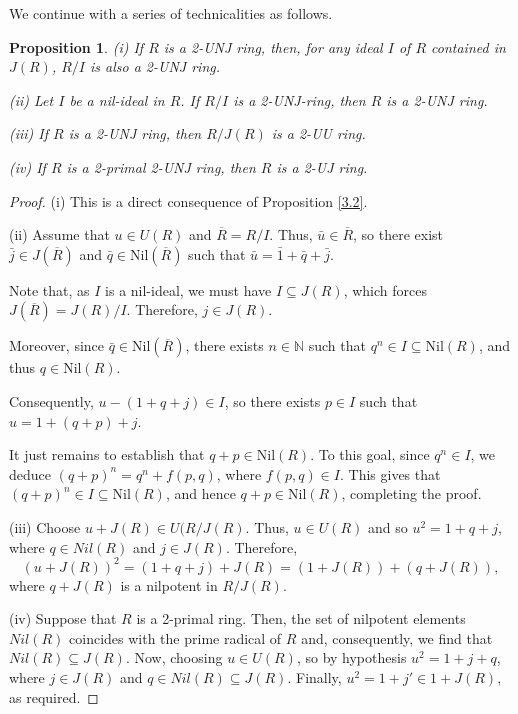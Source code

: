 \documentclass[12pt]{amsart}
\newtheorem{proposition}[theorem]{Proposition}
\theoremstyle{definition}
\begin{document}
We continue with a series of technicalities as follows.

\begin{proposition}\label{3.5}
(i) If \( R \) is a 2-UNJ ring, then, for any ideal \( I \) of \( R \) contained in \( J(R) \), \( R/I \) is also a 2-UNJ ring.

(ii) Let \( I \) be a nil-ideal in \( R \). If \( R/I \) is a 2-UNJ-ring, then \( R \) is a 2-UNJ ring.

(iii) If \( R \) is a 2-UNJ ring, then \( R/J(R) \) is a 2-UU ring.

(iv) If \( R \) is a 2-primal 2-UNJ ring, then \( R \) is a 2-UJ ring.
\end{proposition}

\begin{proof}
(i) This is a direct consequence of Proposition \ref{3.2}.

(ii) Assume that $u \in U(R)$ and $\overline{R}=R/I$. Thus, $\bar{u} \in \overline{R}$, so there exist $\bar{j} \in J(\overline{R})$ and $\bar{q} \in \text{Nil}(\overline{R})$ such that $\bar{u} = \bar{1} + \bar{q} + \bar{j}$.

Note that, as $I$ is a nil-ideal, we must have $I \subseteq J(R)$, which forces $J(\overline{R}) = J(R)/I$. Therefore, $j \in J(R)$.

Moreover, since $\bar{q} \in \text{Nil}(\overline{R})$, there exists $n \in \mathbb{N}$ such that $q^n \in I \subseteq \text{Nil}(R)$, and thus $q \in \text{Nil}(R)$.

Consequently, $u - (1 + q + j) \in I$, so there exists $p \in I$ such that $u = 1 + (q + p) + j$.

It just remains to establish that $q + p \in \text{Nil}(R)$. To this goal, since $q^n \in I$, we deduce $(q + p)^n = q^n + f(p,q)$, where $f(p,q) \in I$. This gives that $(q + p)^n \in I \subseteq \text{Nil}(R)$, and hence $q + p \in \text{Nil}(R)$, completing the proof.

(iii) Choose $u+J(R)\in U(R/J(R)$. Thus, $u\in U(R)$ and so $u^2=1+q+j$, where $q\in Nil(R)$ and $j\in J(R)$. Therefore, $$(u+J(R))^2=(1+q+j)+J(R)=(1+J(R))+(q+J(R)),$$ where $q+J(R)$ is a nilpotent in $R/J(R)$.

(iv) Suppose that \( R \) is a 2-primal ring. Then, the set of nilpotent elements \( Nil(R) \) coincides with the prime radical of \( R \) and, consequently, we find that \( Nil(R) \subseteq J(R) \). Now, choosing $u\in U(R)$, so by hypothesis $u^2=1+j+q$, where $j\in J(R)$ and $q\in Nil(R)\subseteq J(R)$. Finally, $u^2= 1+j'\in 1+J(R)$, as required.
\end{proof}
\end{document}
